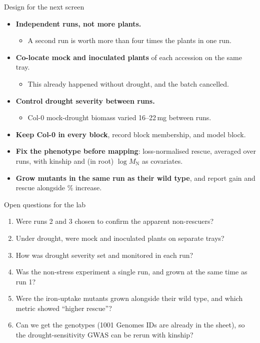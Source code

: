 \documentclass[aspectratio=169,11pt]{beamer}
\newcommand{\MN}{M_{\mathrm N}}
\newcommand{\key}[1]{\textcolor{accent}{\textbf{#1}}}
\begin{document}
\begin{frame}{Design for the next screen}
  \begin{itemize}
    \item \key{Independent runs, not more plants.}
      \begin{itemize}
        \item A second run is worth more than four times the plants in one run.
      \end{itemize}
    \item \key{Co-locate mock and inoculated plants} of each accession on the same tray.
      \begin{itemize}
        \item This already happened without drought, and the batch cancelled.
      \end{itemize}
    \item \key{Control drought severity between runs.}
      \begin{itemize}
        \item Col-0 mock-drought biomass varied 16--22\,mg between runs.
      \end{itemize}
    \item \key{Keep Col-0 in every block}, record block membership, and model block.
    \item \key{Fix the phenotype before mapping}: loss-normalised rescue, averaged over
      runs, with kinship and (in root) $\log\MN$ as covariates.
    \item \key{Grow mutants in the same run as their wild type}, and report gain and rescue
      alongside \% increase.
  \end{itemize}
\end{frame}

\begin{frame}{Open questions for the lab}
  \begin{enumerate}
    \item Were runs 2 and 3 chosen to confirm the apparent non-rescuers?
    \item Under drought, were mock and inoculated plants on separate trays?
    \item How was drought severity set and monitored in each run?
    \item Was the non-stress experiment a single run, and grown at the same time as
      run 1?
    \item Were the iron-uptake mutants grown alongside their wild type, and which metric
      showed ``higher rescue''?
    \item Can we get the genotypes (1001 Genomes IDs are already in the sheet), so the
      drought-sensitivity GWAS can be rerun with kinship?
  \end{enumerate}
\end{frame}
\end{document}
